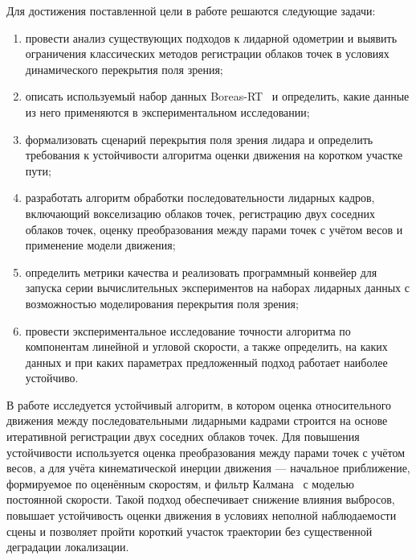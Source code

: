 Для достижения поставленной цели в работе решаются следующие задачи:
\begin{enumerate}
    \item провести анализ существующих подходов к лидарной одометрии и выявить ограничения классических методов регистрации облаков точек в условиях динамического перекрытия поля зрения;
    \item описать используемый набор данных Boreas-RT~\cite{boreas-road-trip} и определить, какие данные из него применяются в экспериментальном исследовании;
    \item формализовать сценарий перекрытия поля зрения лидара и определить требования к устойчивости алгоритма оценки движения на коротком участке пути;
    \item разработать алгоритм обработки последовательности лидарных кадров, включающий вокселизацию облаков точек, регистрацию двух соседних облаков точек, оценку преобразования между парами точек с учётом весов и применение модели движения;
    \item определить метрики качества и реализовать программный конвейер для запуска серии вычислительных экспериментов на наборах лидарных данных с возможностью моделирования перекрытия поля зрения;
    \item провести экспериментальное исследование точности алгоритма по компонентам линейной и угловой скорости, а также определить, на каких данных и при каких параметрах предложенный подход работает наиболее устойчиво.
\end{enumerate}

В работе исследуется устойчивый алгоритм, в котором оценка относительного движения между последовательными лидарными кадрами строится на основе итеративной регистрации двух соседних облаков точек. Для повышения устойчивости используется оценка преобразования между парами точек с учётом весов, а для учёта кинематической инерции движения --- начальное приближение, формируемое по оценённым скоростям, и фильтр Калмана~\cite{habr-kalman-pictures} с моделью постоянной скорости. Такой подход обеспечивает снижение влияния выбросов, повышает устойчивость оценки движения в условиях неполной наблюдаемости сцены и позволяет пройти короткий участок траектории без существенной деградации локализации.


